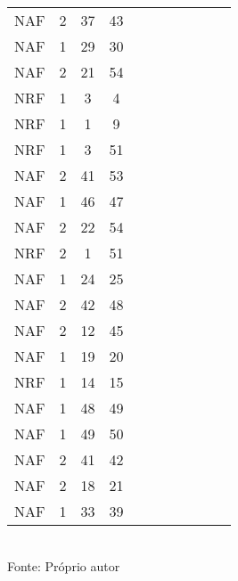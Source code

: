 \begin{table}[H]
{\begin{tabular}{ccccccccccc}
NAF & 2 & 37 & 43 &  &  &  &  &  &  &  \\
NAF & 1 & 29 & 30 &  &  &  &  &  &  &  \\
NAF & 2 & 21 & 54 &  &  &  &  &  &  &  \\
NRF & 1 & 3 & 4 &  &  &  &  &  &  &  \\
NRF & 1 & 1 & 9 &  &  &  &  &  &  &  \\
NRF & 1 & 3 & 51 &  &  &  &  &  &  &  \\
NAF & 2 & 41 & 53 &  &  &  &  &  &  &  \\
NAF & 1 & 46 & 47 &  &  &  &  &  &  &  \\
NAF & 2 & 22 & 54 &  &  &  &  &  &  &  \\
NRF & 2 & 1 & 51 &  &  &  &  &  &  &  \\
NAF & 1 & 24 & 25 &  &  &  &  &  &  &  \\
NAF & 2 & 42 & 48 &  &  &  &  &  &  &  \\
NAF & 2 & 12 & 45 &  &  &  &  &  &  &  \\
NAF & 1 & 19 & 20 &  &  &  &  &  &  &  \\
NRF & 1 & 14 & 15 &  &  &  &  &  &  &  \\
NAF & 1 & 48 & 49 &  &  &  &  &  &  &  \\
NAF & 1 & 49 & 50 &  &  &  &  &  &  &  \\
NAF & 2 & 41 & 42 &  &  &  &  &  &  &  \\
NAF & 2 & 18 & 21 &  &  &  &  &  &  &  \\
NAF & 1 & 33 & 39 &  &  &  &  &  &  &  \\
\bottomrule
\end{tabular}}
\\Fonte: Próprio autor
\end{table}



